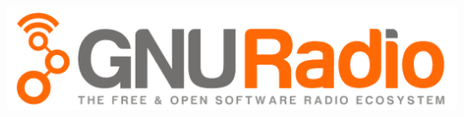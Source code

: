 \documentclass[11pt]{article}
\begin{document}
\includegraphics[width=0.9\linewidth]{gnuradio_logo_web}
\begin{multicols*}{3}

\end{multicols*}
 
\end{document}
